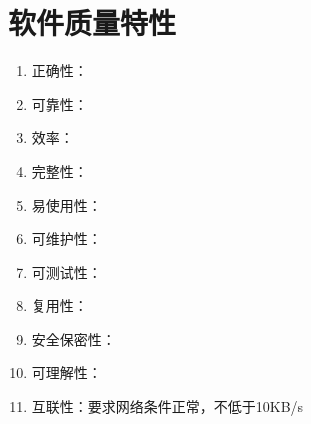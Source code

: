 \chapter{软件质量特性}
\begin{enumerate}
    \item 正确性：
    \item 可靠性：
    \item 效率：
    \item 完整性：
    \item 易使用性：
    \item 可维护性：
    \item 可测试性：
    \item 复用性：
    \item 安全保密性：
    \item 可理解性：
    \item 互联性：要求网络条件正常，不低于10KB/s
\end{enumerate}

